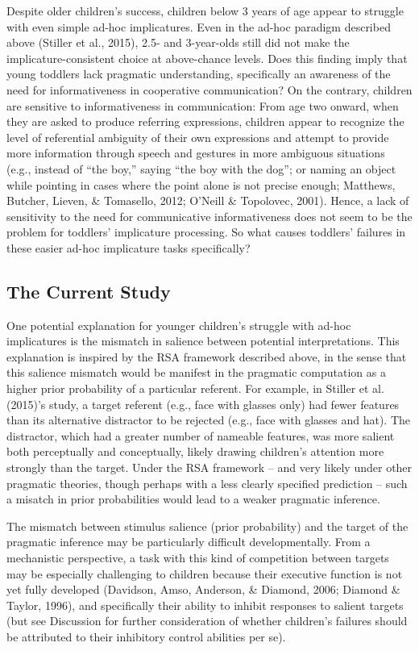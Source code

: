 \documentclass[man]{apa6}
\theoremstyle{definition}
\theoremstyle{definition}
\theoremstyle{definition}
\theoremstyle{remark}
\begin{document}
Despite older children's success, children below 3 years of age appear
to struggle with even simple ad-hoc implicatures. Even in the ad-hoc
paradigm described above (Stiller et al., 2015), 2.5- and 3-year-olds
still did not make the implicature-consistent choice at above-chance
levels. Does this finding imply that young toddlers lack pragmatic
understanding, specifically an awareness of the need for informativeness
in cooperative communication? On the contrary, children are sensitive to
informativeness in communication: From age two onward, when they are
asked to produce referring expressions, children appear to recognize the
level of referential ambiguity of their own expressions and attempt to
provide more information through speech and gestures in more ambiguous
situations (e.g., instead of ``the boy,'' saying ``the boy with the
dog''; or naming an object while pointing in cases where the point alone
is not precise enough; Matthews, Butcher, Lieven, \& Tomasello, 2012;
O'Neill \& Topolovec, 2001). Hence, a lack of sensitivity to the need
for communicative informativeness does not seem to be the problem for
toddlers' implicature processing. So what causes toddlers' failures in
these easier ad-hoc implicature tasks specifically?

\subsection{The Current Study}\label{the-current-study}

One potential explanation for younger children's struggle with ad-hoc
implicatures is the mismatch in salience between potential
interpretations. This explanation is inspired by the RSA framework
described above, in the sense that this salience mismatch would be
manifest in the pragmatic computation as a higher prior probability of a
particular referent. For example, in Stiller et al. (2015)'s study, a
target referent (e.g., face with glasses only) had fewer features than
its alternative distractor to be rejected (e.g., face with glasses and
hat). The distractor, which had a greater number of nameable features,
was more salient both perceptually and conceptually, likely drawing
children's attention more strongly than the target. Under the RSA
framework -- and very likely under other pragmatic theories, though
perhaps with a less clearly specified prediction -- such a misatch in
prior probabilities would lead to a weaker pragmatic inference.

The mismatch between stimulus salience (prior probability) and the
target of the pragmatic inference may be particularly difficult
developmentally. From a mechanistic perspective, a task with this kind
of competition between targets may be especially challenging to children
because their executive function is not yet fully developed (Davidson,
Amso, Anderson, \& Diamond, 2006; Diamond \& Taylor, 1996), and
specifically their ability to inhibit responses to salient targets (but
see Discussion for further consideration of whether children's failures
should be attributed to their inhibitory control abilities per se).
\end{document}
